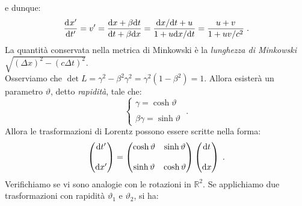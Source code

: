 e dunque:
\begin{equation}
\frac{\mathrm{d}^{}x'}{\mathrm{d}t'^{}}=v'=\frac{\mathrm{d}{x}+\beta\mathrm{d}{t}}{\mathrm{d}{t}+\beta\mathrm{d}{x}}=\frac{\mathrm{d}{x}/\mathrm{d}{t}+u}{1+u\mathrm{d}{x}/\mathrm{d}{t}}=\frac{u+v}{1+uv/c^2}\;.
\end{equation}
La quantità conservata nella metrica di Minkowski è la \textit{lunghezza di Minkowski} $\sqrt{(\Delta x)^2-(c\Delta t)^2}$. \\
Osserviamo che $\det L=\gamma^2-\beta^2\gamma^2=\gamma^2(1-\beta^2)=1$. Allora esisterà un parametro $\vartheta$, detto \textit{rapidità}, tale che:
\begin{equation}
\begin{cases}
\gamma=\cosh\vartheta \\
\\
\beta\gamma=\sinh\vartheta
\end{cases}\;.
\end{equation}
Allora le trasformazioni di Lorentz possono essere scritte nella forma:
\begin{equation}
\begin{pmatrix}
\mathrm{d}{t'} \\
\\
\mathrm{d}{x'}
\end{pmatrix}=\begin{pmatrix}
\cosh\vartheta & \sinh\vartheta \\
\\
\sinh\vartheta & \cosh\vartheta
\end{pmatrix}\begin{pmatrix}
\mathrm{d}{t} \\
\\
\mathrm{d}{x}
\end{pmatrix}\;.
\end{equation}
Verifichiamo se vi sono analogie con le rotazioni in $\mathbb{R}^2$. Se applichiamo due trasformazioni con rapidità $\vartheta_1$ e 
$\vartheta_2$, si ha:
